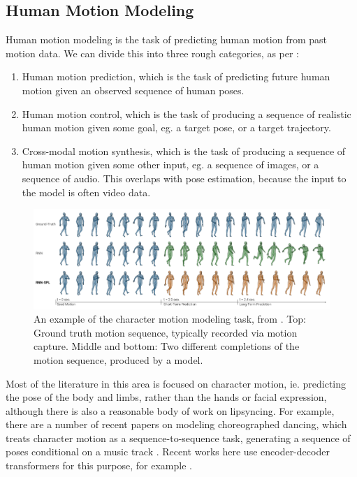 \subsection{Human Motion Modeling}
\label{ss:human-motion-modeling}

Human motion modeling is the task of predicting human motion from past motion data. We can divide this into three rough categories, as per \cite{human-motion-modeling-survey}:
\begin{enumerate}
    \item Human motion prediction, which is the task of predicting future human motion given an observed sequence of human poses.
    \item Human motion control, which is the task of producing a sequence of realistic human motion given some goal, eg. a target pose, or a target trajectory.
    \item Cross-modal motion synthesis, which is the task of producing a sequence of human motion given some other input, eg. a sequence of images, or a sequence of audio. This overlaps with pose estimation, because the input to the model is often video data.
\end{enumerate}

\begin{figure}
    \includegraphics[width=\linewidth]{figures/character-motion-modeling.png}
    \captionsetup{parskip=7pt}
    \caption[Character motion modeling]{An example of the character motion modeling task, from \cite{structured-prediction}. Top: Ground truth motion sequence, typically recorded via motion capture. Middle and bottom: Two different completions of the motion sequence, produced by a model.}
    \hrulefill
    \label{fig:character-motion-modeling}
\end{figure}

Most of the literature in this area is focused on character motion, ie. predicting the pose of the body and limbs, rather than the hands or facial expression, although there is also a reasonable body of work on lipsyncing. For example, there are a number of recent papers on modeling choreographed dancing, which treats character motion as a sequence-to-sequence task, generating a sequence of poses conditional on a music track \cite{dance-choreonet}. Recent works here use encoder-decoder transformers for this purpose, for example \cite{dance-transflower}. 

